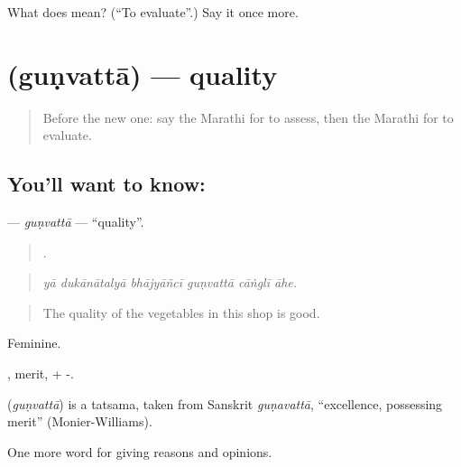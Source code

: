 \begin{tcolorbox}[breakable,colback=teal!4,colframe=teal!35!black,title={Before you move on}]
What does   mean? (\textquotedblleft{}To evaluate\textquotedblright{}.) Say it once more.
\end{tcolorbox}
\section[\texorpdfstring{\mr{गुणवत्ता} (guṇvattā)}{गुणवत्ता (guṇvattā)}]{ (guṇvattā) — quality}

\label{lesson:MR-C376-gunvatta}



\begin{quote}
Before the new one: say the Marathi for to assess, then the Marathi for to evaluate.
\end{quote}

\subsection*{You'll want to know: }
\textbf{} — \emph{guṇvattā} — \textquotedblleft{}quality\textquotedblright{}.

\begin{quote}
     .
\end{quote}

\begin{quote}
\emph{yā dukānātalyā bhājyāñcī guṇvattā cāṅglī āhe.}
\end{quote}

\begin{quote}
The quality of the vegetables in this shop is good.
\end{quote}

Feminine.

, merit, + -.

\begin{cousinweb}
\textbf{} (\emph{guṇvattā}) is a tatsama, taken from Sanskrit \emph{guṇavattā}, \textquotedblleft{}excellence, possessing merit\textquotedblright{} (Monier-Williams).
\end{cousinweb}

\begin{grammarlens}[title={What you've built}]
One more word for giving reasons and opinions.
\end{grammarlens}

